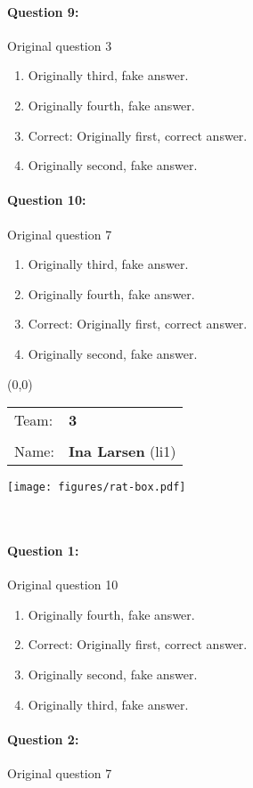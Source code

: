 \documentclass[9pt, twoside, twocolumn]{extarticle}
\renewcommand{\includegraphics}[2][]{\OldIncludegraphics[width=\linewidth, #1]{#2}}
\newcommand{\individualprefix}[3]{%
\begin{textblock}{3.5}(0,0)
\fontfamily{phv}\selectfont
\begin{tabular}{ll}
Team: & \Large\linespread{6} \textbf{#3}\\
      & \\
Name: & \Large\linespread{6} \textbf{#1} (#2)
\end{tabular}

\texttt{[image: figures/rat-box.pdf]}
\end{textblock}
\textcolor{white}{.}\\ %
\vspace{6cm}
}%
\begin{document}
\paragraph{Question 9:}
Original question 3

\begin{enumerate}[label=\textbf{{\Alph*}},labelindent=0pt, labelsep=1.5em, parsep=0.2em]
\item Originally third, fake answer.
\item Originally fourth, fake answer.
\item Correct: Originally first, correct answer.
\item Originally second, fake answer.
\end{enumerate}
\paragraph{Question 10:}
Original question 7

\begin{enumerate}[label=\textbf{{\Alph*}},labelindent=0pt, labelsep=1.5em, parsep=0.2em]
\item Originally third, fake answer.
\item Originally fourth, fake answer.
\item Correct: Originally first, correct answer.
\item Originally second, fake answer.
\end{enumerate}
\cleardoublepage
\newpage

\individualprefix{Ina Larsen}{li1}{3}

\paragraph{Question 1:}
Original question 10

\begin{enumerate}[label=\textbf{{\Alph*}},labelindent=0pt, labelsep=1.5em, parsep=0.2em]
\item Originally fourth, fake answer.
\item Correct: Originally first, correct answer.
\item Originally second, fake answer.
\item Originally third, fake answer.
\end{enumerate}
\paragraph{Question 2:}
Original question 7
\end{document}
